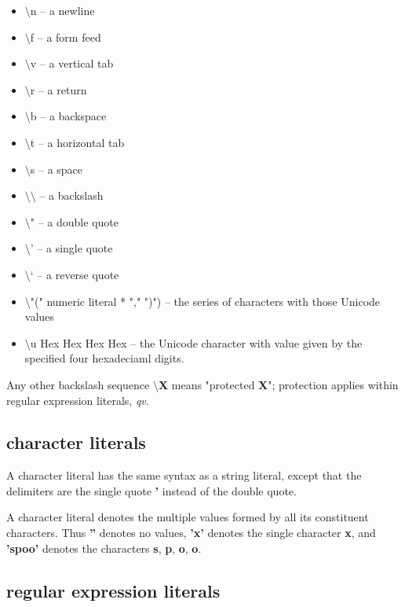 \documentclass{report}
\begin{document}
\begin{itemize}\item $\setminus$n -- a newline

\item $\setminus$f -- a form feed

\item $\setminus$v -- a vertical tab

\item $\setminus$r -- a return

\item $\setminus$b -- a backspace

\item $\setminus$t -- a horizontal tab

\item $\setminus$s -- a space

\item $\setminus$$\setminus$ -- a backslash

\item $\setminus$" -- a double quote

\item $\setminus$' -- a single quote

\item $\setminus$` -- a reverse quote

\item $\setminus$"(" numeric literal * "," ")")
-- the series of characters with those
Unicode values

\item $\setminus$u Hex Hex Hex Hex -- the Unicode character with value given by the
specified four hexadeciaml digits.

\end{itemize}Any other backslash sequence {\bf $\setminus$X} means "protected {\bf X}"; protection applies
within regular expression literals, {\em qv}.\subsection{character literals}


A character literal has the same syntax as a string literal, except that the
delimiters are the single quote {\bf '} instead of the double quote.

A character literal denotes the multiple values formed by all its constituent
characters. Thus {\bf ''} denotes no values, {\bf 'x'} denotes the single character
{\bf x}, and {\bf 'spoo'} denotes the characters {\bf s}, {\bf p}, {\bf o}, {\bf o}.\subsection{regular expression literals}
\end{document}
